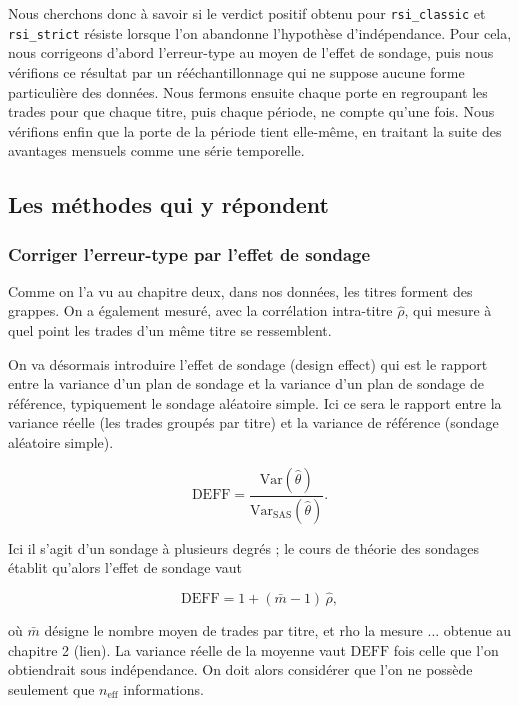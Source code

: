 Nous cherchons donc à savoir si le verdict positif obtenu pour
\texttt{rsi\_classic} et \texttt{rsi\_strict} résiste lorsque l'on abandonne
l'hypothèse d'indépendance. 
Pour cela, nous corrigeons d'abord l'erreur-type
au moyen de l'effet de sondage, puis nous vérifions ce résultat par un
rééchantillonnage qui ne suppose aucune forme particulière des données. Nous
fermons ensuite chaque porte en regroupant les trades pour que chaque titre,
puis chaque période, ne compte qu'une fois. Nous vérifions enfin que la porte
de la période tient elle-même, en traitant la suite des avantages mensuels
comme une série temporelle.

\subsection{Les méthodes qui y répondent}

\subsubsection*{Corriger l'erreur-type par l'effet de sondage}

Comme on l'a vu au chapitre deux, dans nos données, les titres forment des grappes.
On a également mesuré, avec la corrélation intra-titre $\hat\rho$, qui mesure
à quel point les trades d'un même titre se ressemblent.

On va désormais introduire l'effet de sondage (design effect) qui est le rapport
entre la variance d'un plan de sondage et la variance d'un plan de sondage de
référence, typiquement le sondage aléatoire simple.
Ici ce sera le rapport entre la variance réelle (les trades groupés par titre)
et la variance de référence (sondage aléatoire simple).

\[
  \mathrm{DEFF}
    = \frac{\mathrm{Var}(\hat\theta)}{\mathrm{Var}_{\mathrm{SAS}}(\hat\theta)} .
\]

Ici il s'agit d'un sondage à plusieurs degrés ; le cours de théorie des
sondages établit qu'alors l'effet de sondage vaut

\[
  \mathrm{DEFF} = 1 + (\bar m - 1)\,\hat\rho ,
\]

où $\bar m$ désigne le nombre moyen de trades par titre, et rho 
la mesure ... obtenue au chapitre 2 (lien).
La variance réelle de la moyenne vaut $\mathrm{DEFF}$ fois celle que l'on
obtiendrait sous indépendance. On doit alors considérer que l'on ne possède
seulement que $n_{\mathrm{eff}}$ informations.


